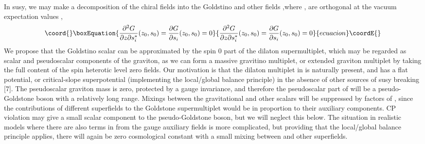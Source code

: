 \documentclass[a4paper,12pt]{article}
\begin{document}
In \coordHE{} susy, we may make a decomposition of the chiral fields
into the Goldstino \coordHE{} and other fields \coordHE{},where \coordHE{},\coordHE{}
are orthogonal at the vacuum expectation values \coordHE{},
\begin{equation}\coord{}\boxEquation{
\frac{\partial^2 G}{\partial z \partial s^{*}_{i}}(z_{0},s_{0}) =
\frac{\partial G}{\partial s_{i}}(z_{0},s_{0}) = 0 \label{PDZ}
}{
\frac{\partial^2 G}{\partial z \partial s^{*}_{i}}(z_{0},s_{0}) =
\frac{\partial G}{\partial s_{i}}(z_{0},s_{0}) = 0 }{ecuacion}\coordE{}\end{equation}
We propose that the Goldstino scalar \coordHE{} can be approximated by
the spin 0 part of the dilaton supermultiplet, which may be
regarded as scalar and pseudoscalar components of the graviton, as
we can form a massive gravitino multiplet, or extended graviton
multiplet by taking the full content of the spin \coordHE{} heterotic level zero fields. Our motivation is
that the dilaton multiplet in \coordHE{} is naturally present, and has
a flat potential, or critical-slope superpotential (implementing
the local/global balance principle) in the absence of other
sources of susy breaking [7]. The pseudoscalar graviton mass is
zero, protected by a gauge invariance, and therefore the
pseudoscalar part of \coordHE{} will be a pseudo-Goldstone boson with a
relatively long range. Mixings between the gravitational and other
scalars will be suppressed by factors of \coordHE{}, since the
contributions of different superfields to the Goldstone
supermultiplet would be in proportion to their auxiliary
components. CP violation may give a small scalar component to the
pseudo-Goldstone boson, but we will neglect this below.
 The situation in realistic models where there are also terms in \coordHE{} from the gauge
auxiliary \coordHE{} fields is more complicated, but providing that the
local/global balance principle applies, there will again be zero
cosmological constant with a small mixing \coordHE{} between
\coordHE{} and other superfields.
\end{document}
